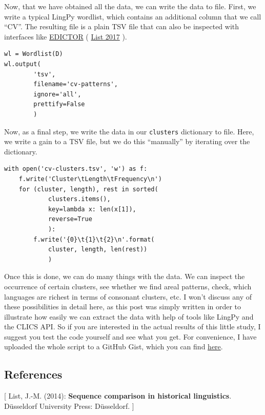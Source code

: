 \documentclass[
  english,
  a4paper,
  oneside,tablecaptionabove
]{scrbook}
\newcommand{\passthrough}[1]{#1}
\begin{document}
Now, that we have obtained all the data, we can write the data to file.
First, we write a typical LingPy wordlist, which contains an additional
column that we call \enquote{CV}. The resulting file is a plain TSV file
that can also be inspected with interfaces like
\href{http://edictor.digling.org}{EDICTOR} (
\href{http://bibliography.lingpy.org?key=List2017d}{List 2017} ).

\begin{lstlisting}
wl = Wordlist(D)
wl.output(
        'tsv', 
        filename='cv-patterns', 
        ignore='all', 
        prettify=False
        )
\end{lstlisting}

Now, as a final step, we write the data in our
\passthrough{\lstinline!clusters!} dictionary to file. Here, we write a
gain to a TSV file, but we do this \enquote{manually} by iterating over
the dictionary.

\begin{lstlisting}
with open('cv-clusters.tsv', 'w') as f:
    f.write('Cluster\tLength\tFrequency\n')
    for (cluster, length), rest in sorted(
            clusters.items(), 
            key=lambda x: len(x[1]),
            reverse=True
            ):
        f.write('{0}\t{1}\t{2}\n'.format(
            cluster, length, len(rest))
            )
\end{lstlisting}

Once this is done, we can do many things with the data. We can inspect
the occurrence of certain clusters, see whether we find areal patterns,
check, which languages are richest in terms of consonant clusters, etc.
I won't discuss any of these possibilities in detail here, as this post
was simply written in order to illustrate how easily we can extract the
data with help of tools like LingPy and the CLICS API. So if you are
interested in the actual results of this little study, I suggest you
test the code yourself and see what you get. For convenience, I have
uploaded the whole script to a GitHub Gist, which you can find
\href{https://gist.github.com/LinguList/1056960125ca79428b420257fa4b02eb}{here}.

\hypertarget{references-3}{%
\subsection*{References}\label{references-3}}

{[} List, J.-M. (2014): \textbf{Sequence comparison in historical
linguistics}. Düsseldorf University Press: Düsseldorf. {]}
\end{document}
